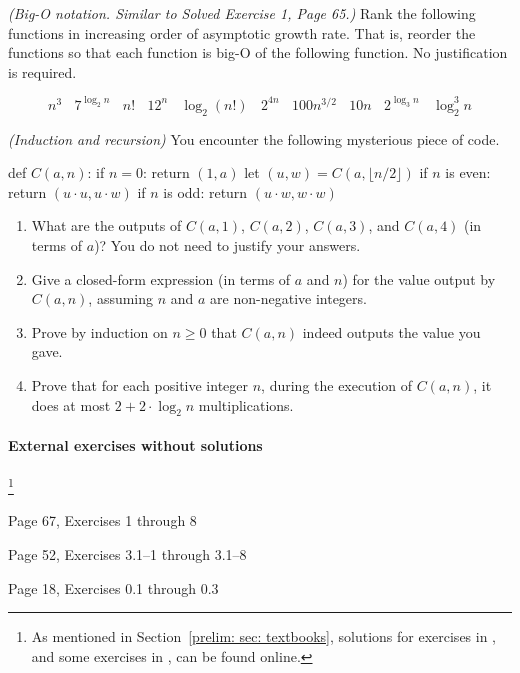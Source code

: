 \documentclass[11pt]{article}
\begin{document}

\exercise \emph{(Big-O notation. Similar to Solved Exercise 1, \KT Page 65.)}
Rank the following functions in increasing order of asymptotic growth rate.
That is, reorder the functions so that each function is big-O of the following function.
No justification is required.

\newcommand{\sep}{~~~~}

\[
  n^3
  \sep
  7^{\log_2 n}
  \sep 
  n!
  \sep 
  12^n
  \sep 
  \log_2 (n!)  
  \sep 
  2^{4n}
  \sep 
  100 n^{3/2}
  \sep 
  10n
  \sep 
  2^{\log_3 n}
  \sep 
  \log_2^3 n
\]


\exercise \emph{(Induction and recursion)}
You encounter the following mysterious piece of code.

\begin{myframed}
  \begin{steps}
  \item[] def $C(a,n)$:
    \step if  $n=0$: return $(1,a)$
    \step let $(u,w) = C(a, \lfloor n/2 \rfloor)$
    \step if $n$ is even:  return $(u \cdot u, u \cdot w)$
    \step if $n$ is odd: return $(u \cdot w, w \cdot w)$
  \end{steps}
\end{myframed}

\begin{enumerate}[label=(\alph*)]
\item What are the outputs of $C(a, 1)$, $C(a,2)$, $C(a,3)$, and $C(a,4)$ (in terms of $a$)?  You do not need to justify your answers.

\item Give a closed-form expression (in terms of $a$ and $n$) for the value output by $C(a,n)$,
  assuming $n$ and $a$ are non-negative integers.

\item 
  Prove by induction on $n \ge 0$ that $C(a,n)$ indeed outputs the value you gave.

\item Prove that for each positive integer $n$, during the execution of $C(a,n)$,
  it does at most $2 + 2 \cdot \log_2 n$ multiplications.
\end{enumerate}

\paragraph{External exercises without solutions}\!\!\!\!\!\footnote
{As mentioned in Section~\ref{prelim: sec: textbooks},
  solutions for exercises in \KT, and some exercises in \CLRS, can be found online.}
\begin{mylist}[-]
\item \KT Page 67, Exercises 1 through 8
\item \CLRS Page 52, Exercises  3.1--1 through 3.1--8
\item \DPV Page 18, Exercises 0.1 through 0.3
\end{mylist}
\end{document}
